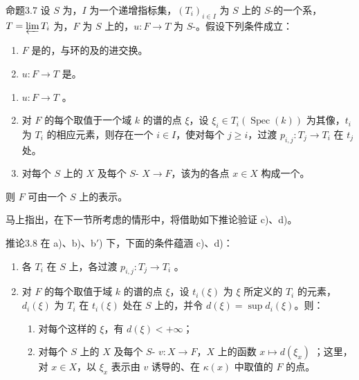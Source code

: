 \begin{SGAresult}{命题}{3.7}
设 $S$ 为，$I$ 为一个递增指标集，$(T_i)_{i\in I}$ 为 $S$ 上的 $S$-的一个系，$T=\varprojlim T_i$ 为，$F$ 为 $S$ 上的，$u:F\to T$ 为 $S$-。假设下列条件成立：
\begin{enumerate}
\item[a)] $F$ 是的，与环的及的进交换。
\item[b)] $u:F\to T$ 是。
\end{enumerate}
\begin{enumerate}
\item[b$'$)] $u:F\to T$ 。
\item[c)] 对 $F$ 的每个取值于一个域 $k$ 的谱的点 $\xi$，设 $\xi_i\in T_i(\operatorname{Spec}(k))$ 为其像，$t_i$ 为 $T_i$ 的相应元素，则存在一个 $i\in I$，使对每个 $j\ge i$，过渡 $p_{i,j}:T_j\to T_i$ 在 $t_j$ 处。
\item[d)] 对每个 $S$ 上的 $X$ 及每个 $S$- $X\to F$，该为的各点 $x\in X$ 构成一个。
\end{enumerate}
则 $F$ 可由一个 $S$ 上的表示。
\end{SGAresult}
马上指出，在下一节所考虑的情形中，将借助如下推论验证 c)、d)。
\begin{SGAresult}{推论}{3.8}
在 a)、b)、b$'$) 下，下面的条件蕴涵 c)、d)：
\begin{enumerate}
\item[c$'$)] 各 $T_i$ 在 $S$ 上，各过渡 $p_{i,j}:T_j\to T_i$ 。
\item[d$'$)] 对 $F$ 的每个取值于域 $k$ 的谱的点 $\xi$，设 $t_i(\xi)$ 为 $\xi$ 所定义的 $T_i$ 的元素，$d_i(\xi)$ 为 $T_i$ 在 $t_i(\xi)$ 处在 $S$ 上的，并令 $d(\xi)=\sup d_i(\xi)$。则：
\begin{enumerate}
\item[$1^\circ$)] 对每个这样的 $\xi$，有 $d(\xi)<+\infty$；
\item[$2^\circ$)] 对每个 $S$ 上的 $X$ 及每个 $S$- $v:X\to F$，$X$ 上的函数 $x\mapsto d(\xi_x)$ ；这里，对 $x\in X$，以 $\xi_x$ 表示由 $v$ 诱导的、在 $\kappa(x)$ 中取值的 $F$ 的点。
\end{enumerate}
\end{enumerate}
\end{SGAresult}

